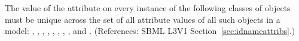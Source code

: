The value of the attribute  on every instance of the following
classes of objects must be unique across the set of all 
attribute values of all such objects in a model: \Model,
\FunctionDefinition, {\Compartment, \Species, \Reaction,
\SpeciesReference, \ModifierSpeciesReference, \Event, and \Parameter}.
(References: SBML L3V1 Section~\ref{sec:idnameattribs}.)
